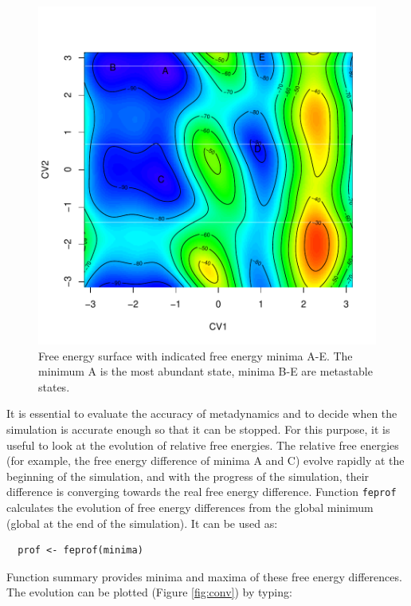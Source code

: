 \begin{Schunk}
\begin{figure}

{\centering \includegraphics[width=0.8\linewidth]{metadynminer_files/figure-latex/minima-1} 

}

\caption[Free energy surface with indicated free energy minima A-E]{Free energy surface with indicated free energy minima A-E. The minimum A is the most abundant state, minima B-E are metastable states.}\label{fig:minima}
\end{figure}
\end{Schunk}

It is essential to evaluate the accuracy of metadynamics and to decide
when the simulation is accurate enough so that it can be stopped. For
this purpose, it is useful to look at the evolution of relative free
energies. The relative free energies (for example, the free energy
difference of minima A and C) evolve rapidly at the beginning of the
simulation, and with the progress of the simulation, their difference is
converging towards the real free energy difference. Function
\texttt{feprof} calculates the evolution of free energy differences from
the global minimum (global at the end of the simulation). It can be used
as:

\begin{verbatim}
  prof <- feprof(minima)
\end{verbatim}

Function summary provides minima and maxima of these free energy
differences. The evolution can be plotted (Figure \ref{fig:conv}) by
typing:

